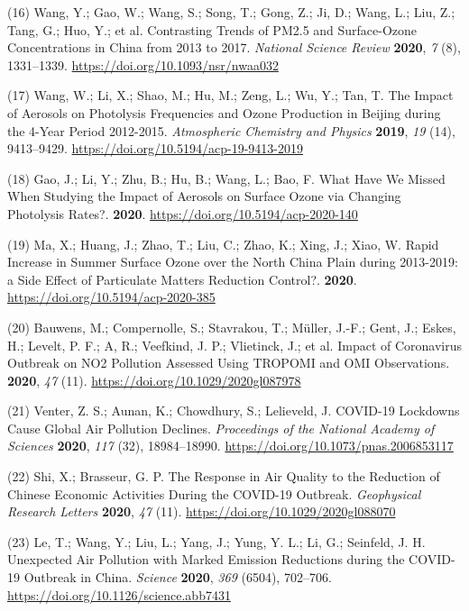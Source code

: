\documentclass[10pt]{article}
\begin{document}
\label{csl:16}(16) Wang, Y.; Gao, W.; Wang, S.; Song, T.; Gong, Z.; Ji, D.; Wang, L.; Liu, Z.; Tang, G.; Huo, Y.; et al. {Contrasting Trends of {PM}2.5 and Surface-Ozone Concentrations in China from 2013 to 2017}. \textit{National Science Review} \textbf{2020}, \textit{7} (8), 1331–1339. \url{https://doi.org/10.1093/nsr/nwaa032}

\label{csl:17}(17) Wang, W.; Li, X.; Shao, M.; Hu, M.; Zeng, L.; Wu, Y.; Tan, T. {The Impact of Aerosols on Photolysis Frequencies and Ozone Production in  Beijing during the 4-Year Period 2012-2015}. \textit{Atmospheric Chemistry and Physics} \textbf{2019}, \textit{19} (14), 9413–9429. \url{https://doi.org/10.5194/acp-19-9413-2019}

\label{csl:18}(18) Gao, J.; Li, Y.; Zhu, B.; Hu, B.; Wang, L.; Bao, F. {What Have We Missed When Studying the Impact of Aerosols on Surface Ozone via Changing Photolysis Rates?}. \textbf{2020}. \url{https://doi.org/10.5194/acp-2020-140}

\label{csl:19}(19) Ma, X.; Huang, J.; Zhao, T.; Liu, C.; Zhao, K.; Xing, J.; Xiao, W. {Rapid Increase in Summer Surface Ozone over the North China Plain during 2013-2019: a Side Effect of Particulate Matters Reduction Control?}. \textbf{2020}. \url{https://doi.org/10.5194/acp-2020-385}

\label{csl:20}(20) Bauwens, M.; Compernolle, S.; Stavrakou, T.; Müller, J.-F.; Gent, J.; Eskes, H.; Levelt, P. F.; A, R.; Veefkind, J. P.; Vlietinck, J.; et al. {Impact of Coronavirus Outbreak on NO2 Pollution Assessed Using TROPOMI and OMI Observations}. \textbf{2020}, \textit{47} (11). \url{https://doi.org/10.1029/2020gl087978}

\label{csl:21}(21) Venter, Z. S.; Aunan, K.; Chowdhury, S.; Lelieveld, J. {{COVID}-19 Lockdowns Cause Global Air Pollution Declines}. \textit{Proceedings of the National Academy of Sciences} \textbf{2020}, \textit{117} (32), 18984–18990. \url{https://doi.org/10.1073/pnas.2006853117}

\label{csl:22}(22) Shi, X.; Brasseur, G. P. {The Response in Air Quality to the Reduction of Chinese Economic Activities During the {COVID}-19 Outbreak}. \textit{Geophysical Research Letters} \textbf{2020}, \textit{47} (11). \url{https://doi.org/10.1029/2020gl088070}

\label{csl:23}(23) Le, T.; Wang, Y.; Liu, L.; Yang, J.; Yung, Y. L.; Li, G.; Seinfeld, J. H. {Unexpected Air Pollution with Marked Emission Reductions during the {COVID}-19 Outbreak in China}. \textit{Science} \textbf{2020}, \textit{369} (6504), 702–706. \url{https://doi.org/10.1126/science.abb7431}
\end{document}

